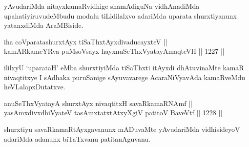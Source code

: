 \begin{artha}
yAvudariMda nitayxkamaRvidhige shamAdiguNa vidhAnadiMda upahatiyiruvudeMbudu modalu tiLidilalxvo adariMda uparata shurxtiyanunx yatanxdiMda AraMBiside.
\end{artha}

\begin{shl}
iha coVparatashurxtAyx \footnotemark[3]tiSaThxtAyxdivaducayxteV || \\
kamARkameYRva puMsoV\s sayx hayxnuSeThxVyatayA\s \s maqteVH \hfill || 1227 ||  
\end{shl}

\begin{artha}
ililxyU `uparataH' eMba shurxtiyiMda tiSaThxti itAyxdi dhAtuvinaMte kamaR nivaqtitxye I sAdhaka puruSanige sAyuvavarege AcaraNiVyavAda kamaRveMdu heVLalapxDutatxve.
\end{artha}


\begin{shl}
anuSeThxVyatayA shurxtAyx nivaqtitxH savaRkamaRNAmf || \\
yasAmxdivxdhiVyateV tasAmxtatxtAtxyXgiV patitoV BaveVtf \hfill || 1228 ||  
\end{shl}

\begin{artha}
shurxtiyu savaRkamaRtAyxgavanunx mADuvaMte yAvudariMda vidhisideyoV adariMda adanunx biTaTxvanu patitanAguvanu.
\end{artha}



